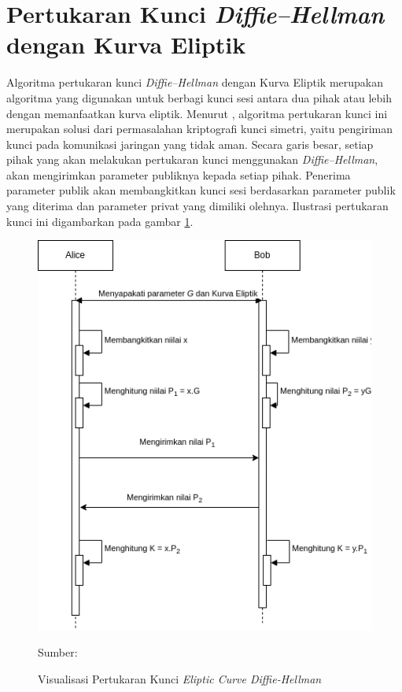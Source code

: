\section{Pertukaran Kunci \emph{Diffie–Hellman} dengan Kurva Eliptik}
Algoritma pertukaran kunci \emph{Diffie–Hellman} dengan Kurva Eliptik merupakan algoritma yang digunakan untuk berbagi kunci sesi antara dua pihak atau lebih dengan memanfaatkan kurva eliptik. Menurut \textcite{munir2019}, algoritma pertukaran kunci ini merupakan solusi dari permasalahan kriptografi kunci simetri, yaitu pengiriman kunci pada komunikasi jaringan yang tidak aman. Secara garis besar, setiap pihak yang akan melakukan pertukaran kunci menggunakan \emph{Diffie–Hellman}, akan mengirimkan parameter publiknya kepada setiap pihak. Penerima parameter publik akan membangkitkan kunci sesi berdasarkan parameter publik yang diterima dan parameter privat yang dimiliki olehnya. Ilustrasi pertukaran kunci ini digambarkan pada gambar \ref{fig:crypto.ecdh}.

\begin{figure}[!h]
  \centering
  \includegraphics[width=12cm]{chapters/res/chapter-2/img/crypto.ecdh.png}
  \caption{Visualisasi Pertukaran Kunci \emph{Eliptic Curve Diffie-Hellman}} \label{fig:crypto.ecdh}
  Sumber: \textcite{munir2019}
\end{figure}

